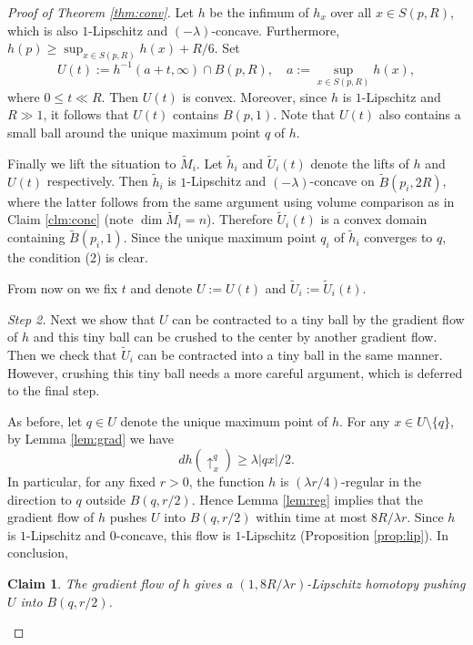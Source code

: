 \documentclass[a4paper,12pt]{amsart}
\theoremstyle{plain}
\newtheorem{clm}[thm]{Claim}
\theoremstyle{definition}
\numberwithin{thm}{section}
\numberwithin{equation}{section}
\newcommand{\step}[1]{\medskip\noindent\textit{#1.}}
\begin{document}
\begin{proof}[Proof of Theorem \ref{thm:conv}]
Let $h$ be the infimum of $h_x$ over all $x\in S(p,R)$, which is also $1$-Lipschitz and $(-\lambda)$-concave.
Furthermore, $h(p)\ge\sup_{x\in S(p,R)}h(x)+R/6$.
Set
\[U(t):=h^{-1}(a+t,\infty)\cap B(p,R),\quad a:=\sup_{x\in S(p,R)}h(x),\]
where $0\le t\ll R$.
Then $U(t)$ is convex.
Moreover, since $h$ is $1$-Lipschitz and $R\gg 1$, it follows that $U(t)$ contains $B(p,1)$.
Note that $U(t)$ also contains a small ball around the unique maximum point $q$ of $h$.

Finally we lift the situation to $\tilde M_i$.
Let $\tilde h_i$ and $\tilde U_i(t)$ denote the lifts of $h$ and $U(t)$ respectively.
Then $\tilde h_i$ is $1$-Lipschitz and $(-\lambda)$-concave on $\tilde B(p_i,2R)$, where the latter follows from the same argument using volume comparison as in Claim \ref{clm:conc} (note $\dim\tilde M_i=n$).
Therefore $\tilde U_i(t)$ is a convex domain containing $\tilde B(p_i,1)$.
Since the unique maximum point $q_i$ of $\tilde h_i$ converges to $q$, the condition (2) is clear.

From now on we fix $t$ and denote $U:=U(t)$ and $\tilde U_i:=\tilde U_i(t)$.

\step{Step 2}
Next we show that $U$ can be contracted to a tiny ball by the gradient flow of $h$ and this tiny ball can be crushed to the center by another gradient flow.
Then we check that $\tilde U_i$ can be contracted into a tiny ball in the same manner.
However, crushing this tiny ball needs a more careful argument, which is deferred to the final step.

As before, let $q\in U$ denote the unique maximum point of $h$.
For any $x\in U\setminus\{q\}$, by Lemma \ref{lem:grad} we have
\[dh(\uparrow_x^q)\ge\lambda|qx|/2.\]
In particular, for any fixed $r>0$, the function $h$ is $(\lambda r/4)$-regular in the direction to $q$ outside $B(q,r/2)$.
Hence Lemma \ref{lem:reg} implies that the gradient flow of $h$ pushes $U$ into $B(q,r/2)$ within time at most $8R/\lambda r$.
Since $h$ is $1$-Lipschitz and $0$-concave, this flow is $1$-Lipschitz (Proposition \ref{prop:lip}).
In conclusion,

\begin{clm}\label{clm:flow1}
The gradient flow of $h$ gives a $(1,8R/\lambda r)$-Lipschitz homotopy pushing $U$ into $B(q,r/2)$.
\end{clm}


\end{proof}
\end{document}
